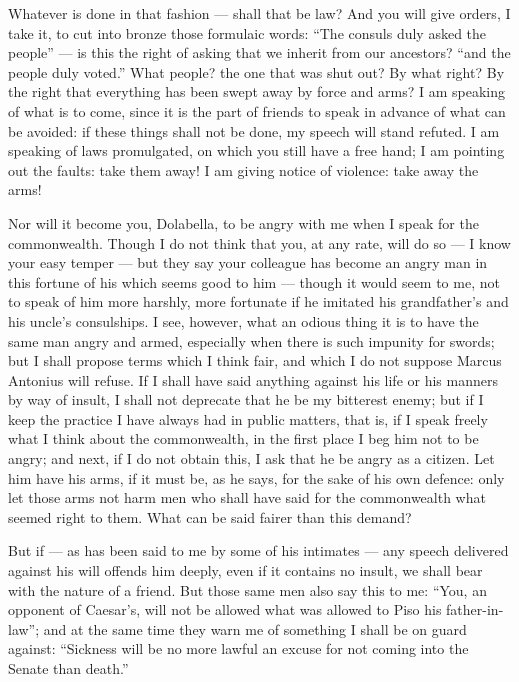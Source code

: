  Whatever is done in that fashion --- shall that be law? And you will give orders, I take it, to cut into bronze those formulaic words: ``The consuls duly asked the people'' --- is this the right of asking that we inherit from our ancestors? ``and the people duly voted.'' What people? the one that was shut out? By what right? By the right that everything has been swept away by force and arms? I am speaking of what is to come, since it is the part of friends to speak in advance of what can be avoided: if these things shall not be done, my speech will stand refuted. I am speaking of laws promulgated, on which you still have a free hand; I am pointing out the faults: take them away! I am giving notice of violence: take away the arms!

 Nor will it become you, Dolabella, to be angry with me when I speak for the commonwealth. Though I do not think that you, at any rate, will do so --- I know your easy temper --- but they say your colleague has become an angry man in this fortune of his which seems good to him --- though it would seem to me, not to speak of him more harshly, more fortunate if he imitated his grandfather's and his uncle's consulships. I see, however, what an odious thing it is to have the same man angry and armed, especially when there is such impunity for swords; but I shall propose terms which I think fair, and which I do not suppose Marcus Antonius will refuse. If I shall have said anything against his life or his manners by way of insult, I shall not deprecate that he be my bitterest enemy; but if I keep the practice I have always had in public matters, that is, if I speak freely what I think about the commonwealth, in the first place I beg him not to be angry; and next, if I do not obtain this, I ask that he be angry as a citizen. Let him have his arms, if it must be, as he says, for the sake of his own defence: only let those arms not harm men who shall have said for the commonwealth what seemed right to them. What can be said fairer than this demand?

 But if --- as has been said to me by some of his intimates --- any speech delivered against his will offends him deeply, even if it contains no insult, we shall bear with the nature of a friend. But those same men also say this to me: ``You, an opponent of Caesar's, will not be allowed what was allowed to Piso his father-in-law''; and at the same time they warn me of something I shall be on guard against: ``Sickness will be no more lawful an excuse for not coming into the Senate than death.''

